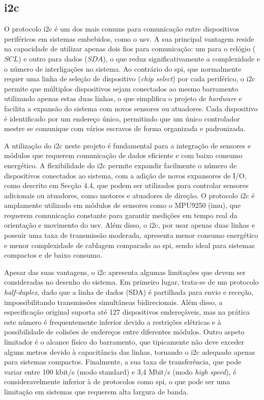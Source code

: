 \subsection{\acrfull{i2c}} \label{subsec:i2c}

O protocolo \gls{i2c} é um dos mais comuns para comunicação entre dispositivos periféricos em sistemas embebidos, como o \gls{usv}. A sua principal vantagem reside na capacidade de utilizar apenas dois fios para comunicação: um para o relógio (\(SCL\)) e outro para dados (\(SDA\)), o que reduz significativamente a complexidade e o número de interligações no sistema. Ao contrário do \gls{spi}, que normalmente requer uma linha de seleção de dispositivo (\emph{chip select}) por cada periférico, o \gls{i2c} permite que múltiplos dispositivos sejam conectados ao mesmo barramento utilizando apenas estas duas linhas, o que simplifica o projeto de \emph{hardware} e facilita a expansão do sistema com novos sensores ou atuadores. Cada dispositivo é identificado por um endereço único, permitindo que um único controlador mestre se comunique com vários escravos de forma organizada e padronizada.

A utilização do \gls{i2c} neste projeto é fundamental para a integração de sensores e módulos que requerem comunicação de dados eficiente e com baixo consumo energético. A flexibilidade do \gls{i2c} permite expandir facilmente o número de dispositivos conectados ao sistema, com a adição de novos expansores de I/O, como descrito em \cite{didactic-robot-thesis} Secção 4.4, que podem ser utilizados para controlar sensores adicionais ou atuadores, como motores e atuadores de direção. O protocolo \gls{i2c} é amplamente utilizado em módulos de sensores como o MPU9250 (\gls{imu}), que requerem comunicação constante para garantir medições em tempo real da orientação e movimento do \gls{usv}. Além disso, o \gls{i2c}, por usar apenas duas linhas e possuir uma taxa de transmissão moderada, apresenta menor consumo energético e menor complexidade de cablagem comparado ao \gls{spi}, sendo ideal para sistemas compactos e de baixo consumo.

Apesar das suas vantagens, o \gls{i2c} apresenta algumas limitações que devem ser consideradas no desenho do sistema. Em primeiro lugar, trata-se de um protocolo \textit{half-duplex}, dado que a linha de dados (SDA) é partilhada para envio e receção, impossibilitando transmissões simultâneas bidirecionais. Além disso, a especificação original suporta até 127 dispositivos endereçáveis, mas na prática este número é frequentemente inferior devido a restrições elétricas e à possibilidade de colisões de endereços entre diferentes módulos. Outro aspeto limitador é o alcance físico do barramento, que tipicamente não deve exceder alguns metros devido à capacitância das linhas, tornando o \gls{i2c} adequado apenas para sistemas compactos. Finalmente, a sua taxa de transferência, que pode variar entre 100 kbit/s (modo standard) e 3,4 Mbit/s (modo \emph{high speed}), é consideravelmente inferior à de protocolos como \gls{spi}, o que pode ser uma limitação em sistemas que requerem alta largura de banda.



